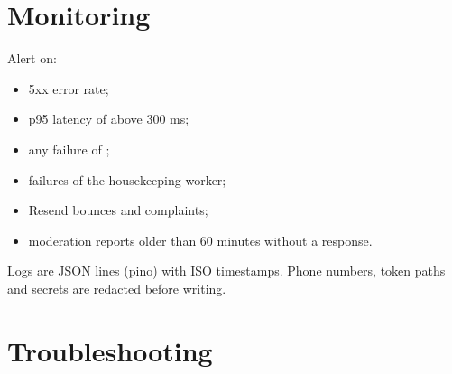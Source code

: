 \section{Monitoring}

Alert on:
\begin{itemize}
  \item 5xx error rate;
  \item p95 latency of  above 300 ms;
  \item any failure of ;
  \item failures of the housekeeping worker;
  \item Resend bounces and complaints;
  \item moderation reports older than 60 minutes without a response.
\end{itemize}
Logs are JSON lines (pino) with ISO timestamps. Phone numbers, token paths and secrets are redacted before writing.

\section{Troubleshooting}

